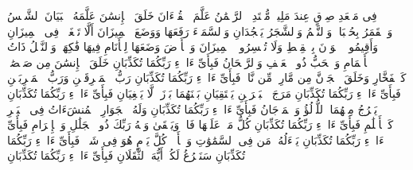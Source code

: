 \startbuffer[\q:54:55]
فِی مَقۡعَدِ صِدۡقٍ عِندَ مَلِیكࣲ مُّقۡتَدِرِۭ%
\stopbuffer%
\startbuffer[\q:55:1]
ٱلرَّحۡمَٰنُ%
\stopbuffer%
\startbuffer[\q:55:2]
عَلَّمَ ٱلۡقُرۡءَانَ%
\stopbuffer%
\startbuffer[\q:55:3]
خَلَقَ ٱلۡإِنسَٰنَ%
\stopbuffer%
\startbuffer[\q:55:4]
عَلَّمَهُ ٱلۡبَیَانَ%
\stopbuffer%
\startbuffer[\q:55:5]
ٱلشَّمۡسُ وَٱلۡقَمَرُ بِحُسۡبَانࣲ%
\stopbuffer%
\startbuffer[\q:55:6]
وَٱلنَّجۡمُ وَٱلشَّجَرُ یَسۡجُدَانِ%
\stopbuffer%
\startbuffer[\q:55:7]
وَٱلسَّمَاۤءَ رَفَعَهَا وَوَضَعَ ٱلۡمِیزَانَ%
\stopbuffer%
\startbuffer[\q:55:8]
أَلَّا تَطۡغَوۡا۟ فِی ٱلۡمِیزَانِ%
\stopbuffer%
\startbuffer[\q:55:9]
وَأَقِیمُوا۟ ٱلۡوَزۡنَ بِٱلۡقِسۡطِ وَلَا تُخۡسِرُوا۟ ٱلۡمِیزَانَ%
\stopbuffer%
\startbuffer[\q:55:10]
وَٱلۡأَرۡضَ وَضَعَهَا لِلۡأَنَامِ%
\stopbuffer%
\startbuffer[\q:55:11]
فِیهَا فَٰكِهَةࣱ وَٱلنَّخۡلُ ذَاتُ ٱلۡأَكۡمَامِ%
\stopbuffer%
\startbuffer[\q:55:12]
وَٱلۡحَبُّ ذُو ٱلۡعَصۡفِ وَٱلرَّیۡحَانُ%
\stopbuffer%
\startbuffer[\q:55:13]
فَبِأَیِّ ءَالَاۤءِ رَبِّكُمَا تُكَذِّبَانِ%
\stopbuffer%
\startbuffer[\q:55:14]
خَلَقَ ٱلۡإِنسَٰنَ مِن صَلۡصَٰلࣲ كَٱلۡفَخَّارِ%
\stopbuffer%
\startbuffer[\q:55:15]
وَخَلَقَ ٱلۡجَاۤنَّ مِن مَّارِجࣲ مِّن نَّارࣲ%
\stopbuffer%
\startbuffer[\q:55:16]
فَبِأَیِّ ءَالَاۤءِ رَبِّكُمَا تُكَذِّبَانِ%
\stopbuffer%
\startbuffer[\q:55:17]
رَبُّ ٱلۡمَشۡرِقَیۡنِ وَرَبُّ ٱلۡمَغۡرِبَیۡنِ%
\stopbuffer%
\startbuffer[\q:55:18]
فَبِأَیِّ ءَالَاۤءِ رَبِّكُمَا تُكَذِّبَانِ%
\stopbuffer%
\startbuffer[\q:55:19]
مَرَجَ ٱلۡبَحۡرَیۡنِ یَلۡتَقِیَانِ%
\stopbuffer%
\startbuffer[\q:55:20]
بَیۡنَهُمَا بَرۡزَخࣱ لَّا یَبۡغِیَانِ%
\stopbuffer%
\startbuffer[\q:55:21]
فَبِأَیِّ ءَالَاۤءِ رَبِّكُمَا تُكَذِّبَانِ%
\stopbuffer%
\startbuffer[\q:55:22]
یَخۡرُجُ مِنۡهُمَا ٱللُّؤۡلُؤُ وَٱلۡمَرۡجَانُ%
\stopbuffer%
\startbuffer[\q:55:23]
فَبِأَیِّ ءَالَاۤءِ رَبِّكُمَا تُكَذِّبَانِ%
\stopbuffer%
\startbuffer[\q:55:24]
وَلَهُ ٱلۡجَوَارِ ٱلۡمُنشَءَاتُ فِی ٱلۡبَحۡرِ كَٱلۡأَعۡلَٰمِ%
\stopbuffer%
\startbuffer[\q:55:25]
فَبِأَیِّ ءَالَاۤءِ رَبِّكُمَا تُكَذِّبَانِ%
\stopbuffer%
\startbuffer[\q:55:26]
كُلُّ مَنۡ عَلَیۡهَا فَانࣲ%
\stopbuffer%
\startbuffer[\q:55:27]
وَیَبۡقَىٰ وَجۡهُ رَبِّكَ ذُو ٱلۡجَلَٰلِ وَٱلۡإِكۡرَامِ%
\stopbuffer%
\startbuffer[\q:55:28]
فَبِأَیِّ ءَالَاۤءِ رَبِّكُمَا تُكَذِّبَانِ%
\stopbuffer%
\startbuffer[\q:55:29]
یَسۡءَلُهُۥ مَن فِی ٱلسَّمَٰوَٰتِ وَٱلۡأَرۡضِۚ كُلَّ یَوۡمٍ هُوَ فِی شَأۡنࣲ%
\stopbuffer%
\startbuffer[\q:55:30]
فَبِأَیِّ ءَالَاۤءِ رَبِّكُمَا تُكَذِّبَانِ%
\stopbuffer%
\startbuffer[\q:55:31]
سَنَفۡرُغُ لَكُمۡ أَیُّهَ ٱلثَّقَلَانِ%
\stopbuffer%
\startbuffer[\q:55:32]
فَبِأَیِّ ءَالَاۤءِ رَبِّكُمَا تُكَذِّبَانِ%
\stopbuffer%
\startbuffer[\q:55:33]
